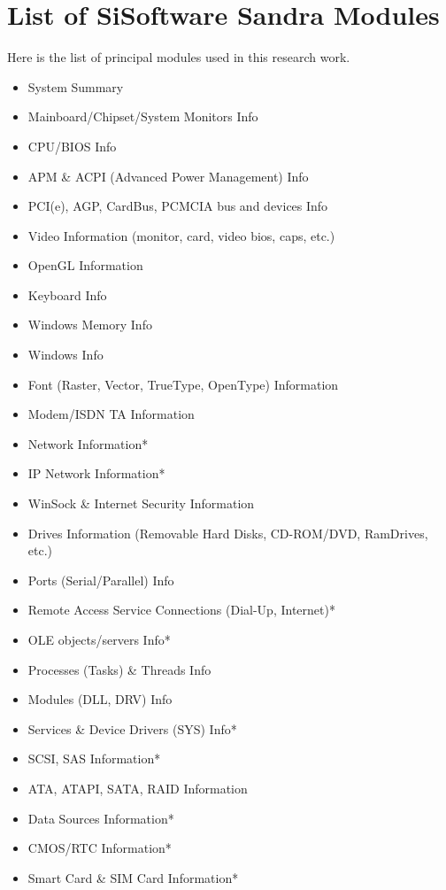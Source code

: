 

\chapter{List of SiSoftware Sandra Modules} \label{app:sandra_modules}

    Here is the list of principal modules used in this research work.
    \begin{itemize}
        \item System Summary
        \item Mainboard/Chipset/System Monitors Info
        \item CPU/BIOS Info
        \item APM \& ACPI (Advanced Power Management) Info
        \item PCI(e), AGP, CardBus, PCMCIA bus and devices Info
        \item Video Information (monitor, card, video bios, caps, etc.)
        \item OpenGL Information
        \item Keyboard Info
        \item Windows Memory Info
        \item Windows Info
        \item Font (Raster, Vector, TrueType, OpenType) Information
        \item Modem/ISDN TA Information
        \item Network Information*
        \item IP Network Information*
        \item WinSock \& Internet Security Information
        \item Drives Information (Removable Hard Disks, CD-ROM/DVD, RamDrives, etc.)
        \item Ports (Serial/Parallel) Info
        \item Remote Access Service Connections (Dial-Up, Internet)*
        \item OLE objects/servers Info*
        \item Processes (Tasks) \& Threads Info
        \item Modules (DLL, DRV) Info
        \item Services \& Device Drivers (SYS) Info*
        \item SCSI, SAS Information*
        \item ATA, ATAPI, SATA, RAID Information
        \item Data Sources Information*
        \item CMOS/RTC Information*
        \item Smart Card \& SIM Card Information*
    \end{itemize}
        
